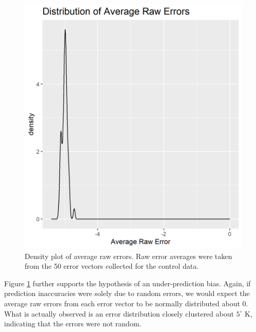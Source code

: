 \documentclass[oneside,12pt]{amsart}
\begin{document}
 \begin{figure}{}
     \centering
     \includegraphics{control_ave_err_density.png}
     \caption{Density plot of average raw errors. Raw error averages were taken from the 50 error vectors collected for the control data.}
     \label{fig:err_denisty}
 \end{figure}

Figure \ref{fig:err_denisty} further supports the hypothesis of an under-prediction bias. Again, if prediction inaccuracies were solely due to random errors, we would expect the average raw errors from each error vector to be normally distributed about 0. What is actually observed is an error distribution closely clustered about $5^\circ$ K, indicating that the errors were not random.
\end{document}
